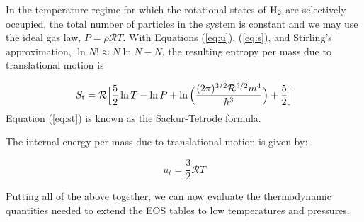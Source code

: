  In the temperature regime for which the rotational states of $\rm{H}_2$ are selectively occupied, the total number of particles in the system is constant and we may use the ideal gas law, $P=\rho \mathcal{R} T$. With Equations (\ref{eq:u}), (\ref{eq:s}), and Stirling's approximation, $\ln N! \approx N \ln N-N$, the resulting entropy per mass due to translational motion is

\begin{equation}
\label{eq:st}
S_{\rm t}=\mathcal{R} \Big[ \frac{5}{2} \ln{T} - \ln{P} + \ln \Big( \frac{(2 \pi)^{3/2} \mathcal{R}^{5/2} m^4}{h^3}\Big) +\frac{5}{2} \Big]
\end{equation}
Equation (\ref{eq:st}) is known as the Sackur-Tetrode formula. %

The internal energy per mass due to translational motion is given by:

\begin{equation}
\label{eq:ut}
u_t=\frac{3}{2} \mathcal{R} T
\end{equation}

Putting all of the above together, we can now evaluate the thermodynamic quantities needed to extend the \cite{saumon95} EOS tables to low temperatures and pressures.

